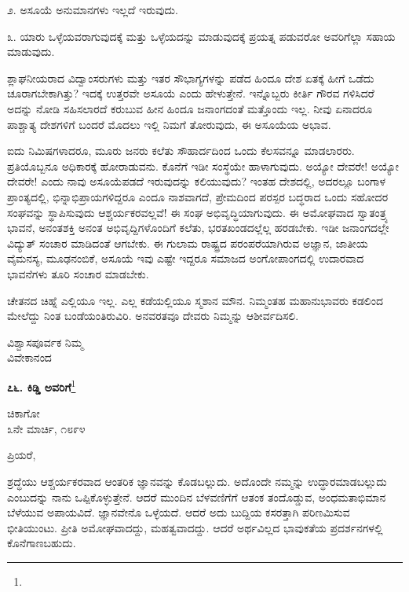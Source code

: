 ೨. ಅಸೂಯೆ ಅನುಮಾನಗಳು ಇಲ್ಲದೆ ಇರುವುದು.

೩. ಯಾರು ಒಳ್ಳೆಯವರಾಗುವುದಕ್ಕೆ ಮತ್ತು ಒಳ್ಳೆಯದನ್ನು ಮಾಡುವುದಕ್ಕೆ ಪ್ರಯತ್ನ ಪಡುವರೋ ಅವರಿಗೆಲ್ಲಾ ಸಹಾಯ ಮಾಡುವುದು.

ಶ್ಲಾಘನೀಯರಾದ ವಿದ್ವಾಂಸರುಗಳು ಮತ್ತು ಇತರ ಸೌಭಾಗ್ಯಗಳನ್ನು ಪಡೆದ ಹಿಂದೂ ದೇಶ ಏತಕ್ಕೆ ಹೀಗೆ ಒಡೆದು ಚೂರಾಗಬೇಕಾಗಿತ್ತು? ಇದಕ್ಕೆ ಉತ್ತರವೇ ಅಸೂಯೆ ಎಂದು ಹೇಳುತ್ತೇನೆ. ಇನ್ನೊಬ್ಬರು ಕೀರ್ತಿ ಗೌರವ ಗಳಿಸಿದರೆ ಅದನ್ನು ನೋಡಿ ಸಹಿಸಲಾರದೆ ಕರುಬುವ ಹೀನ ಹಿಂದೂ ಜನಾಂಗದಂತೆ ಮತ್ತೊಂದು ಇಲ್ಲ. ನೀವು ಏನಾದರೂ ಪಾಶ್ಚಾತ್ಯ ದೇಶಗಳಿಗೆ ಬಂದರೆ ಮೊದಲು ಇಲ್ಲಿ ನಿಮಗೆ ತೋರುವುದು, ಈ ಅಸೂಯೆಯ ಅಭಾವ.

ಐದು ನಿಮಿಷಗಳಾದರೂ, ಮೂರು ಜನರು ಕಲೆತು ಸೌಹಾರ್ದದಿಂದ ಒಂದು ಕೆಲಸವನ್ನೂ ಮಾಡಲಾರರು. ಪ್ರತಿಯೊಬ್ಬನೂ ಅಧಿಕಾರಕ್ಕೆ ಹೋರಾಡುವನು. ಕೊನೆಗೆ ಇಡೀ ಸಂಸ್ಥೆಯೇ ಹಾಳಾಗುವುದು. ಅಯ್ಯೋ ದೇವರೇ! ಅಯ್ಯೋ ದೇವರೇ! ಎಂದು ನಾವು ಅಸೂಯೆಪಡದೆ ಇರುವುದನ್ನು ಕಲಿಯುವುದು? ಇಂತಹ ದೇಶದಲ್ಲಿ, ಅದರಲ್ಲೂ ಬಂಗಾಳ ಪ್ರಾಂತ್ಯದಲ್ಲಿ, ಭಿನ್ನಾಭಿಪ್ರಾಯಗಳಿದ್ದರೂ ಎಂದೂ ನಾಶವಾಗದೆ, ಪ್ರೇಮದಿಂದ ಪರಸ್ಪರ ಬದ್ಧರಾದ ಒಂದು ಸಹೋದರ ಸಂಘವನ್ನು ಸ್ಥಾಪಿಸುವುದು ಆಶ್ಚರ್ಯಕರವಲ್ಲವೆ! ಈ ಸಂಘ ಅಭಿವೃದ್ಧಿಯಾಗುವುದು. ಈ ಅಮೋಘವಾದ ಸ್ವಾತಂತ್ರ್ಯ ಭಾವನೆ, ಅನಂತಶಕ್ತಿ ಅನಂತ ಅಭಿವೃದ್ದಿಗಳೊಂದಿಗೆ ಕಲೆತು, ಭರತಖಂಡದಲ್ಲೆಲ್ಲ ಹರಡಬೇಕು. ಇಡೀ ಜನಾಂಗದಲ್ಲೇ ವಿದ್ಯುತ್‌ ಸಂಚಾರ ಮಾಡಿದಂತೆ ಆಗಬೇಕು. ಈ ಗುಲಾಮ ರಾಷ್ಟ್ರದ ಪರಂಪರೆಯಾಗಿರುವ ಅಜ್ಞಾನ, ಜಾತೀಯ ವೈಮನಸ್ಯ, ಮೂಢನಂಬಿಕೆ, ಅಸೂಯೆ ಇವು ಎಷ್ಟೇ ಇದ್ದರೂ ಸಮಾಜದ ಅಂಗೋಪಾಂಗದಲ್ಲಿ ಉದಾರವಾದ ಭಾವನೆಗಳು ತೂರಿ ಸಂಚಾರ ಮಾಡಬೇಕು.

ಚೇತನದ ಚಿಹ್ನೆ ಎಲ್ಲಿಯೂ ಇಲ್ಲ. ಎಲ್ಲ ಕಡೆಯಲ್ಲಿಯೂ ಸ್ಮಶಾನ ಮೌನ. ನಿಮ್ಮಂತಹ ಮಹಾನುಭಾವರು ಕಡಲಿಂದ ಮೇಲೆದ್ದು ನಿಂತ ಬಂಡೆಯಂತಿರುವಿರಿ. ಅನವರತವೂ ದೇವರು ನಿಮ್ಮನ್ನು ಆಶೀರ್ವದಿಸಲಿ.

{\flushright
ವಿಶ್ವಾಸಪೂರ್ವಕ ನಿಮ್ಮ\\ವಿವೇಕಾನಂದ\par}

\begin{center}
\textbf{೭೬. ಕಿಡ್ಡಿ ಅವರಿಗೆ}\footnote{}
\end{center}

\begin{flushright}
ಚಿಕಾಗೋ\\೩ನೇ ಮಾರ್ಚಿ, ೧೮೯೪
\end{flushright}

\noindent
ಪ್ರಿಯರೆ,

ಶ್ರದ್ಧೆಯು ಆಶ್ಚರ್ಯಕರವಾದ ಆಂತರಿಕ ಜ್ಞಾನವನ್ನು ಕೊಡಬಲ್ಲುದು. ಅದೊಂದೇ ನಮ್ಮನ್ನು ಉದ್ಧಾರಮಾಡಬಲ್ಲುದು ಎಂಬುದನ್ನು ನಾನು ಒಪ್ಪಿಕೊಳ್ಳುತ್ತೇನೆ. ಆದರೆ ಮುಂದಿನ ಬೆಳವಣಿಗೆಗೆ ಆತಂಕ ತಂದೊಡ್ಡುವ, ಅಂಧಮತಾಭಿಮಾನ ಬೆಳೆಯುವ ಅಪಾಯವಿದೆ. ಜ್ಞಾನವೇನೊ ಒಳ್ಳೆಯದೆ. ಆದರೆ ಅದು ಬುದ್ದಿಯ ಕಸರತ್ತಾಗಿ ಪರಿಣಮಿಸುವ ಭೀತಿಯುಂಟು. ಪ್ರೀತಿ ಅಮೋಘವಾದದ್ದು, ಮಹತ್ವವಾದದ್ದು. ಆದರೆ ಅರ್ಥವಿಲ್ಲದ ಭಾವುಕತೆಯ ಪ್ರದರ್ಶನಗಳಲ್ಲಿ ಕೊನೆಗಾಣಬಹುದು.

\vspace{0.2cm}

